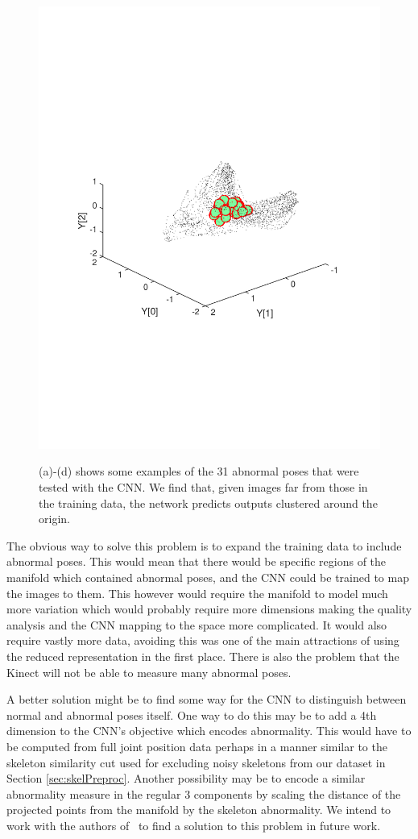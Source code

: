 \documentclass[11pt]{article} %
\begin{document}
\begin{figure}
{{\includegraphics*[width=0.70\linewidth,clip,trim={2cm 8cm 2cm 9cm}]{abnormalsPloted}}}
\caption{ (a)-(d) shows some examples of the 31 abnormal poses that were tested with the CNN. We find that, given images far from those in the training data, the network predicts outputs clustered around the origin. }
\label{fig:abCnn}
\end{figure}

The obvious way to solve this problem is to expand the training data to include abnormal poses. This would mean that there would be specific regions of the manifold which contained abnormal poses, and the CNN could be trained to map the images to them. This however would require the manifold to model much more variation which would probably require more dimensions making the quality analysis and the CNN mapping to the space more complicated. It would also require vastly more data, avoiding this was one of the main attractions of using the reduced representation in the first place. There is also the problem that the Kinect will not be able to measure many abnormal poses. 

A better solution might be to find some way for the CNN to distinguish between normal and abnormal poses itself. One way to do this may be to add a 4th dimension to the CNN's objective which encodes abnormality. This would have to be computed from full joint position data perhaps in a manner similar to the skeleton similarity cut used for excluding noisy skeletons from our dataset in Section \ref{sec:skelPreproc}. Another possibility may be to encode a similar abnormality measure in the regular 3 components by scaling the distance of the projected points from the manifold by the skeleton abnormality. We intend to work with the authors of~\cite{Paiement} to find a solution to this problem in future work.
\end{document}
